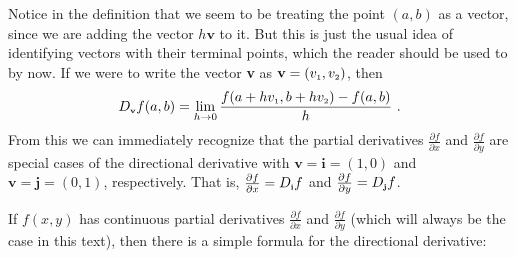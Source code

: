 
Notice in the definition that we seem to be treating the point $(a,b)$ as a vector, since we are adding the
vector $h\textbf{v}$ to it. But this is just the usual idea of identifying vectors with their terminal points, which
the reader should be used to by now. If we were to write the vector \textbf{v} as $\textbf{v} = (v_{\scriptscriptstyle 1},v_{\scriptscriptstyle 2})$, then
\begin{equation}\label{eqn:dirderivpt}
 D_{\scriptscriptstyle \textbf{v}}f(a,b) = \lim_{h \to 0} \dfrac{f(a+hv_{\scriptscriptstyle 1},b+hv_{\scriptscriptstyle 2}) - f(a,b)}{h} ~.
\end{equation}
From this we can immediately recognize that the partial derivatives $\tfrac{\partial f}{\partial x}$ and
$\tfrac{\partial f}{\partial y}$ are special cases of the directional derivative with $\textbf{v} = \textbf{i} = (1,0)$
and $\textbf{v} = \textbf{j} = (0,1)$, respectively. 
That is, $\tfrac{\partial f}{\partial x} = D_{\scriptscriptstyle \textbf{i}}f$
and $\tfrac{\partial f}{\partial y} = D_{\scriptscriptstyle \textbf{j}}f$. 

If $f(x,y)$ has continuous partial derivatives $\tfrac{\partial f}{\partial x}$ and
$\tfrac{\partial f}{\partial y}$ (which will always be the case in this text), then there is a simple formula for the
directional derivative:

